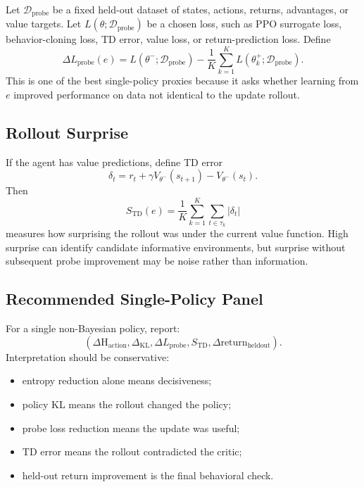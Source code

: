 \documentclass[11pt]{article}
\newcommand{\D}{\mathcal{D}}
\newcommand{\Hent}{\mathrm{H}}
\begin{document}
Let $\D_{\mathrm{probe}}$ be a fixed held-out dataset of states, actions,
returns, advantages, or value targets. Let $L(\theta;\D_{\mathrm{probe}})$ be a
chosen loss, such as PPO surrogate loss, behavior-cloning loss, TD error, value
loss, or return-prediction loss. Define
\begin{equation}
  \Delta L_{\mathrm{probe}}(e)
  =
  L(\theta^-;\D_{\mathrm{probe}})
  -
  \frac{1}{K}\sum_{k=1}^{K}
  L(\theta_k^+;\D_{\mathrm{probe}}).
\end{equation}
This is one of the best single-policy proxies because it asks whether learning
from $e$ improved performance on data not identical to the update rollout.

\subsection{Rollout Surprise}

If the agent has value predictions, define TD error
\begin{equation}
  \delta_t
  =
  r_t + \gamma V_{\theta^-}(s_{t+1}) - V_{\theta^-}(s_t).
\end{equation}
Then
\begin{equation}
  S_{\mathrm{TD}}(e)
  =
  \frac{1}{K}\sum_{k=1}^{K}
  \sum_{t \in \tau_k}|\delta_t|
\end{equation}
measures how surprising the rollout was under the current value function. High
surprise can identify candidate informative environments, but surprise without
subsequent probe improvement may be noise rather than information.

\subsection{Recommended Single-Policy Panel}

For a single non-Bayesian policy, report:
\begin{equation}
  \left(
  \Delta \Hent_{\mathrm{action}},
  \Delta_{\mathrm{KL}},
  \Delta L_{\mathrm{probe}},
  S_{\mathrm{TD}},
  \Delta \mathrm{return}_{\mathrm{heldout}}
  \right).
\end{equation}
Interpretation should be conservative:
\begin{itemize}[leftmargin=*]
  \item entropy reduction alone means decisiveness;
  \item policy KL means the rollout changed the policy;
  \item probe loss reduction means the update was useful;
  \item TD error means the rollout contradicted the critic;
  \item held-out return improvement is the final behavioral check.
\end{itemize}
\end{document}
